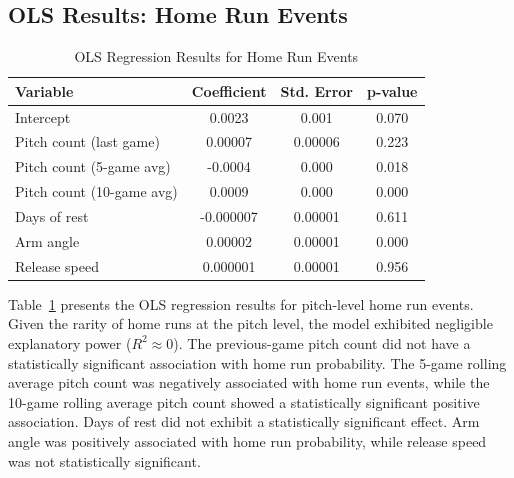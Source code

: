 \documentclass[12pt, letterpaper]{article}
\begin{document}
\subsection{OLS Results: Home Run Events}
\begin{table}[htbp]
\centering
\begin{tabular}{lccc}
\hline
Variable & Coefficient & Std. Error & p-value \\
\hline
Intercept & 0.0023 & 0.001 & 0.070 \\
Pitch count (last game) & 0.00007 & 0.00006 & 0.223 \\
Pitch count (5-game avg) & -0.0004 & 0.000 & 0.018 \\
Pitch count (10-game avg) & 0.0009 & 0.000 & 0.000 \\
Days of rest & -0.000007 & 0.00001 & 0.611 \\
Arm angle & 0.00002 & 0.00001 & 0.000 \\
Release speed & 0.000001 & 0.00001 & 0.956 \\
\hline
\end{tabular}
\caption{OLS Regression Results for Home Run Events}
\label{tab:homerun}
\end{table}
Table~\ref{tab:homerun} presents the OLS regression results for pitch-level home run events. 
Given the rarity of home runs at the pitch level, the model exhibited negligible explanatory power ($R^2 \approx 0$). The previous-game pitch count did not have a statistically significant association with home run probability. The 5-game rolling average pitch count was negatively associated with home run events, while the 10-game rolling average pitch count showed a statistically significant positive association. Days of rest did not exhibit a statistically significant effect. Arm angle was positively associated with home run probability, while release speed was not statistically significant.
\end{document}
